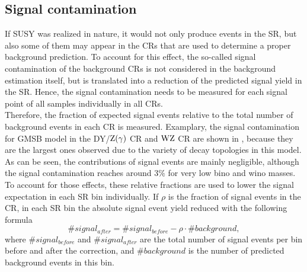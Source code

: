\subsection{Signal contamination}\label{sec:signalCont}
If SUSY was realized in nature, it would not only produce events in the SR, but also some of them may appear in the CRs that are used to determine a proper background prediction. To account for this effect, the so-called signal contamination of the background CRs is not considered in the background estimation itself, but is translated into a reduction of the predicted signal yield in the SR. Hence, the signal contamination needs to be measured for each signal point of all samples individually in all CRs.\\
Therefore, the fraction of expected signal events relative to the total number of background events in each CR is measured.
Examplary, the signal contamination for GMSB model in the DY/$\mathrm{Z}(\gamma)$ CR and $\mathrm{W}\mathrm{Z}$ CR are shown in , because they are the largest ones observed due to the variety of decay topologies in this model. As can be seen, the contributions of signal events are mainly negligible, although the signal contamination reaches around $3\%$ for very low bino and wino masses.\\
To account for those effects, these relative fractions are used to lower the signal expectation in each SR bin individually. If $\rho$ is the fraction of signal events in the CR, in each SR bin the absolute signal event yield reduced with the following formula
\begin{equation}
 \#signal_{after} = \#signal_{before} - \rho\cdot\#background,
\end{equation}
where $\#signal_{before}$ and $\#signal_{after}$ are the total number of signal events per bin before and after the correction, and $\#background$ is the number of predicted background events in this bin.


